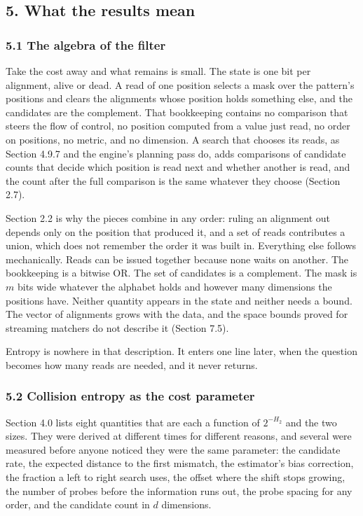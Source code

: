 \subsection{5. What the results mean}

\subsubsection{5.1 The algebra of the filter}

Take the cost away and what remains is small. The state is one bit per alignment, alive or dead. A read of one position selects a mask over the pattern's positions and clears the alignments whose position holds something else, and the candidates are the complement. That bookkeeping contains no comparison that steers the flow of control, no position computed from a value just read, no order on positions, no metric, and no dimension. A search that chooses its reads, as Section 4.9.7 and the engine's planning pass do, adds comparisons of candidate counts that decide which position is read next and whether another is read, and the count after the full comparison is the same whatever they choose (Section 2.7).

Section 2.2 is why the pieces combine in any order: ruling an alignment out depends only on the position that produced it, and a set of reads contributes a union, which does not remember the order it was built in. Everything else follows mechanically. Reads can be issued together because none waits on another. The bookkeeping is a bitwise OR. The set of candidates is a complement. The mask is \(m\) bits wide whatever the alphabet holds and however many dimensions the positions have. Neither quantity appears in the state and neither needs a bound. The vector of alignments grows with the data, and the space bounds proved for streaming matchers do not describe it (Section 7.5).

Entropy is nowhere in that description. It enters one line later, when the question becomes how many reads are needed, and it never returns.

\subsubsection{5.2 Collision entropy as the cost parameter}

Section 4.0 lists eight quantities that are each a function of \(2^{-H_2}\) and the two sizes. They were derived at different times for different reasons, and several were measured before anyone noticed they were the same parameter: the candidate rate, the expected distance to the first mismatch, the estimator's bias correction, the fraction a left to right search uses, the offset where the shift stops growing, the number of probes before the information runs out, the probe spacing for any order, and the candidate count in \(d\) dimensions.

